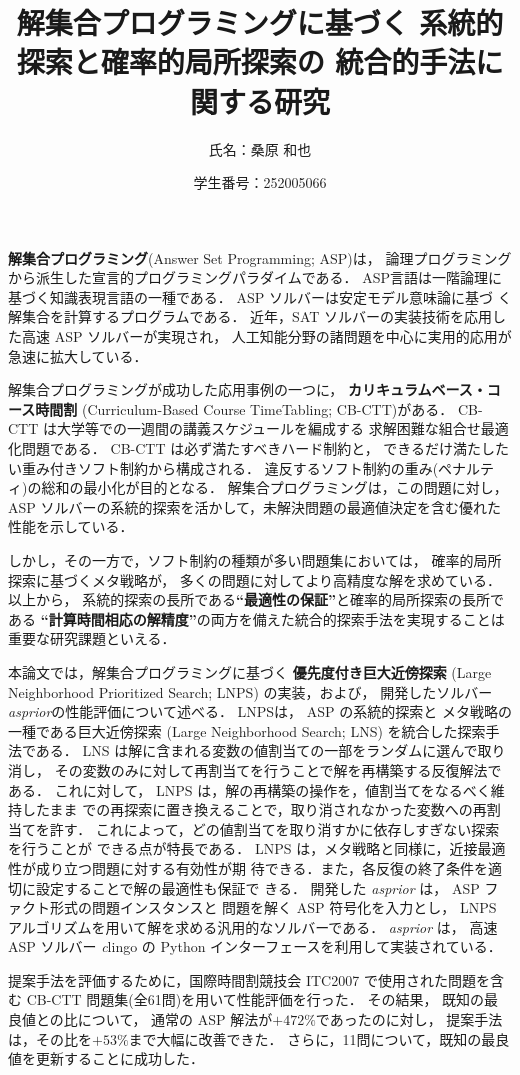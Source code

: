 \documentclass[dvipdfmx,a4paper]{jsarticle}
\title{解集合プログラミングに基づく
系統的探索と確率的局所探索の
統合的手法に関する研究}
\author{氏名：桑原 和也}
\date{学生番号：252005066}
\begin{document}
\maketitle

\textbf{解集合プログラミング}(Answer Set Programming; ASP)は，
論理プログラミングから派生した宣言的プログラミングパラダイムである．
ASP言語は一階論理に基づく知識表現言語の一種である．
ASP ソルバーは安定モデル意味論に基づ
く解集合を計算するプログラムである．
近年，SAT ソルバーの実装技術を応用した高速 ASP ソルバーが実現され，
人工知能分野の諸問題を中心に実用的応用が急速に拡大している．

解集合プログラミングが成功した応用事例の一つに，
\textbf{カリキュラムベース・コース時間割}
(Curriculum-Based Course TimeTabling; CB-CTT)がある．
CB-CTT は大学等での一週間の講義スケジュールを編成する
求解困難な組合せ最適化問題である．
CB-CTT は必ず満たすべきハード制約と，
できるだけ満たしたい重み付きソフト制約から構成される．
違反するソフト制約の重み(ペナルティ)の総和の最小化が目的となる．
解集合プログラミングは，この問題に対し，
ASP ソルバーの系統的探索を活かして，未解決問題の最適値決定を含む優れた
性能を示している．

しかし，その一方で，ソフト制約の種類が多い問題集においては，
確率的局所探索に基づくメタ戦略が，
多くの問題に対してより高精度な解を求めている．
以上から，
系統的探索の長所である\textbf{``最適性の保証''}と確率的局所探索の長所である
\textbf{``計算時間相応の解精度''}の両方を備えた統合的探索手法を実現することは
重要な研究課題といえる．

本論文では，解集合プログラミングに基づく
\textbf{優先度付き巨大近傍探索}
(Large Neighborhood Prioritized Search; LNPS)
の実装，および，
開発したソルバー \textit{asprior}の性能評価について述べる．
%
LNPSは，
ASP の系統的探索と
メタ戦略の一種である巨大近傍探索
(Large Neighborhood Search; LNS)
を統合した探索手法である．
%
LNS は解に含まれる変数の値割当ての一部をランダムに選んで取り消し，
その変数のみに対して再割当てを行うことで解を再構築する反復解法である．
これに対して，
LNPS は，解の再構築の操作を，値割当てをなるべく維持したまま
での再探索に置き換えることで，取り消されなかった変数への再割当てを許す．
これによって，どの値割当てを取り消すかに依存しすぎない探索を行うことが
できる点が特長である．
LNPS は，メタ戦略と同様に，近接最適性が成り立つ問題に対する有効性が期
待できる．また，各反復の終了条件を適切に設定することで解の最適性も保証で
きる．
開発した \textit{asprior} は，
ASP ファクト形式の問題インスタンスと
問題を解く ASP 符号化を入力とし，
LNPS アルゴリズムを用いて解を求める汎用的なソルバーである．
\textit{asprior} は，
高速 ASP ソルバー {\textit clingo}
の Python インターフェースを利用して実装されている．

提案手法を評価するために，国際時間割競技会 ITC2007
で使用された問題を含む CB-CTT 問題集(全61問)を用いて性能評価を行った．
その結果，
既知の最良値との比について，
通常の ASP 解法が$+472\%$であったのに対し，
提案手法は，その比を$+53\%$まで大幅に改善できた．
さらに，11問について，既知の最良値を更新することに成功した．
\end{document}

